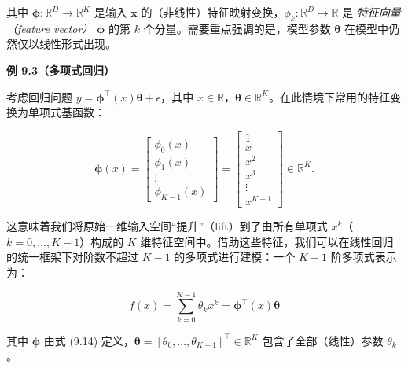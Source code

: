 其中 $ \boldsymbol{\phi}: \mathbb{R}^D \to \mathbb{R}^K $ 是输入 $ \boldsymbol{x} $ 的（非线性）特征映射变换，$ \phi_k: \mathbb{R}^D \to \mathbb{R} $ 是 \emph{特征向量（feature vector）} $ \boldsymbol{\phi} $ 的第 $ k $ 个分量。需要重点强调的是，模型参数 $ \boldsymbol{\theta} $ 在模型中仍然仅以线性形式出现。

\begin{notebox}
\textbf{例 9.3（多项式回归）}
\end{notebox}

\begin{notebox}
考虑回归问题 $ y = \boldsymbol{\phi}^\top(x)\boldsymbol{\theta} + \epsilon $，其中 $ x \in \mathbb{R} $，$ \boldsymbol{\theta} \in \mathbb{R}^K $。在此情境下常用的特征变换为单项式基函数：
\end{notebox}

\begin{notebox}
\begin{equation}
\boldsymbol{\phi}(x) = \begin{bmatrix} \phi_0(x) \\ \phi_1(x) \\ \vdots \\ \phi_{K-1}(x) \end{bmatrix} = \begin{bmatrix} 1 \\ x \\ x^2 \\ x^3 \\ \vdots \\ x^{K-1} \end{bmatrix} \in \mathbb{R}^K .
\tag{9.14}
\end{equation}
\end{notebox}

\begin{notebox}
这意味着我们将原始一维输入空间“提升”（lift）到了由所有单项式 $ x^k $（$ k = 0, \ldots, K-1 $）构成的 $ K $ 维特征空间中。借助这些特征，我们可以在线性回归的统一框架下对阶数不超过 $ K-1 $ 的多项式进行建模：一个 $ K-1 $ 阶多项式表示为：
\end{notebox}

\begin{notebox}
\begin{equation}
f(x) = \sum_{k=0}^{K-1}\theta_k x^k = \boldsymbol{\phi}^\top(x)\boldsymbol{\theta}
\tag{9.15}
\end{equation}
\end{notebox}

\begin{notebox}
其中 $ \boldsymbol{\phi} $ 由式 (9.14) 定义，$ \boldsymbol{\theta} = [\theta_0, \ldots, \theta_{K-1}]^\top \in \mathbb{R}^K $ 包含了全部（线性）参数 $ \theta_k $。
\end{notebox}

